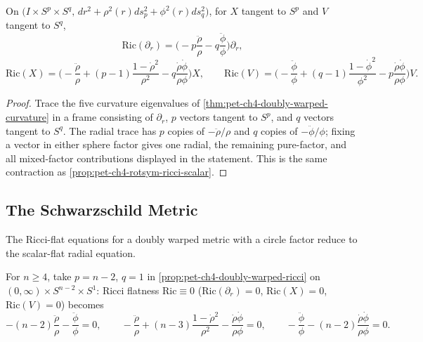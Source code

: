 \begin{proposition}
  \label{prop:pet-ch4-doubly-warped-ricci}

  On $\big(I\times S^p\times S^q,\,dr^2+\rho^2(r)ds_p^2+\phi^2(r)ds_q^2\big)$, for
  $X$ tangent to $S^p$ and $V$ tangent to $S^q$,
  \[
    \mathrm{Ric}(\partial_r)=\Big(-p\frac{\ddot\rho}\rho-q\frac{\ddot\phi}\phi\Big)\partial_r,
  \]
  \[
    \mathrm{Ric}(X)=\Big(-\frac{\ddot\rho}\rho+(p-1)\frac{1-\dot\rho^2}{\rho^2}-q\frac{\dot\rho\dot\phi}{\rho\phi}\Big)X,
    \qquad
    \mathrm{Ric}(V)=\Big(-\frac{\ddot\phi}\phi+(q-1)\frac{1-\dot\phi^2}{\phi^2}-p\frac{\dot\rho\dot\phi}{\rho\phi}\Big)V.
  \]
\end{proposition}
\begin{proof}
  \sketch
  Trace the five curvature eigenvalues of
  \cref{thm:pet-ch4-doubly-warped-curvature} in a frame consisting of
  $\partial_r$, $p$ vectors tangent to $S^p$, and $q$ vectors tangent to $S^q$.
  The radial trace has $p$ copies of $-\ddot\rho/\rho$ and $q$ copies of
  $-\ddot\phi/\phi$; fixing a vector in either sphere factor gives one radial,
  the remaining pure-factor, and all mixed-factor contributions displayed in
  the statement. This is the same contraction as
  \cref{prop:pet-ch4-rotsym-ricci-scalar}.
\end{proof}

\subsection{The Schwarzschild Metric}

The Ricci-flat equations for a doubly warped metric with a circle factor reduce to
the scalar-flat radial equation.

\begin{definition}
  \label{def:pet-ch4-schwarzschild-construction}


  For $n\ge4$, take $p=n-2$, $q=1$ in
  \cref{prop:pet-ch4-doubly-warped-ricci} on
  $(0,\infty)\times S^{n-2}\times S^1$: Ricci flatness $\mathrm{Ric}\equiv0$
  ($\mathrm{Ric}(\partial_r)=0$, $\mathrm{Ric}(X)=0$, $\mathrm{Ric}(V)=0$) becomes
  \[
    -(n-2)\frac{\ddot\rho}\rho-\frac{\ddot\phi}\phi=0,\qquad
    -\frac{\ddot\rho}\rho+(n-3)\frac{1-\dot\rho^2}{\rho^2}-\frac{\dot\rho\dot\phi}{\rho\phi}=0,\qquad
    -\frac{\ddot\phi}\phi-(n-2)\frac{\dot\rho\dot\phi}{\rho\phi}=0.
  \]
\end{definition}

